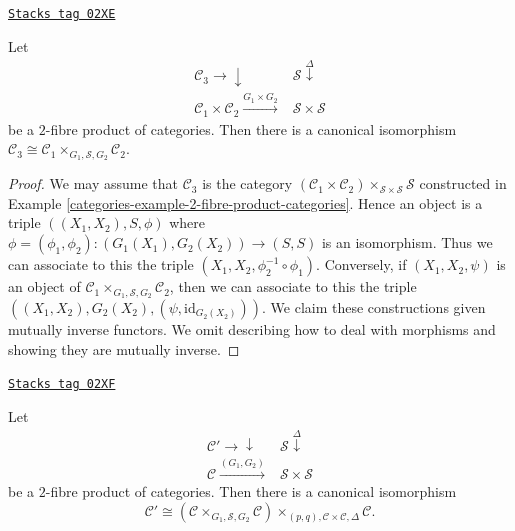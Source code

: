 \begin{lemma}[Diagonal 1]
\label{categories-lemma-diagonal-1}
\href{https://stacks.math.columbia.edu/tag/02XE}{\texttt{Stacks tag 02XE}}

Let
$$
\begin{array}{cc}\mathcal{C}_3 \longrightarrow\downarrow & \mathcal{S} \overset{\Delta}{\downarrow} \\ \mathcal{C}_1 \times \mathcal{C}_2 \overset{G_1 \times G_2}{\longrightarrow} & \mathcal{S} \times \mathcal{S}\end{array}
$$
be a $2$-fibre product of categories.
Then there is a canonical isomorphism
$\mathcal{C}_3 \cong
\mathcal{C}_1 \times_{G_1, \mathcal{S}, G_2} \mathcal{C}_2$.
\end{lemma}

\begin{proof}

We may assume that $\mathcal{C}_3$ is the category
$(\mathcal{C}_1 \times \mathcal{C}_2)\times_{\mathcal{S} \times \mathcal{S}}
\mathcal{S}$ constructed in Example \ref{categories-example-2-fibre-product-categories}.
Hence an object is a triple
$((X_1, X_2), S, \phi)$ where
$\phi = (\phi_1, \phi_2) : (G_1(X_1), G_2(X_2)) \to (S, S)$
is an isomorphism. Thus we can associate to this the triple
$(X_1, X_2, \phi_2^{-1} \circ \phi_1)$.
Conversely, if $(X_1, X_2, \psi)$ is an object of
$\mathcal{C}_1 \times_{G_1, \mathcal{S}, G_2} \mathcal{C}_2$,
then we can associate to this the triple
$((X_1, X_2), G_2(X_2), (\psi, \text{id}_{G_2(X_2)}))$.
We claim these constructions given mutually inverse functors.
We omit describing how to deal with morphisms
and showing they are mutually inverse.
\end{proof}

\begin{lemma}[Diagonal 2]
\label{categories-lemma-diagonal-2}
\href{https://stacks.math.columbia.edu/tag/02XF}{\texttt{Stacks tag 02XF}}

Let
$$
\begin{array}{cc}\mathcal{C}' \longrightarrow\downarrow & \mathcal{S} \overset{\Delta}{\downarrow} \\ \mathcal{C} \overset{(G_1, G_2)}{\longrightarrow} & \mathcal{S} \times \mathcal{S}\end{array}
$$
be a $2$-fibre product of categories.
Then there is a canonical isomorphism
$$
\mathcal{C}' \cong
(\mathcal{C} \times_{G_1, \mathcal{S}, G_2} \mathcal{C})
\times_{(p, q), \mathcal{C} \times \mathcal{C}, \Delta}
\mathcal{C}.
$$
\end{lemma}

